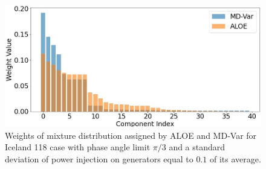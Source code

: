 



\begin{figure}[t]
    \centering
    \includegraphics[width=.95\textwidth]{Dissertation/images/sampling/weights_pi3_grid118i.jpg}
    \captionsetup{justification=centering}
    \caption{Weights of mixture distribution %
    assigned by ALOE and MD-Var for Iceland 118 case with phase angle limit $\pi/3$ and a standard deviation of power injection on generators equal to $0.1$ of its average.}
    \label{fig:weights118}
\end{figure}



